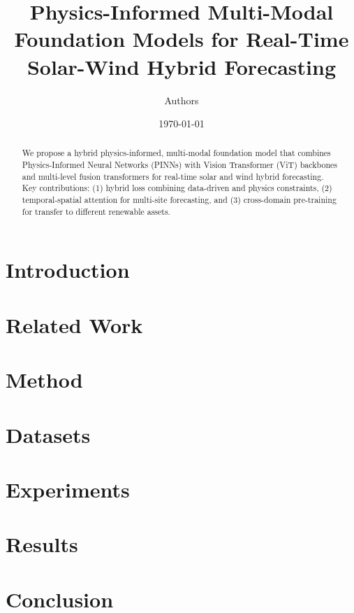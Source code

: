 \documentclass[11pt]{article}
\title{Physics-Informed Multi-Modal Foundation Models for Real-Time Solar-Wind Hybrid Forecasting}
\author{Authors}
\date{\today}
\begin{document}
\maketitle
\begin{abstract}
We propose a hybrid physics-informed, multi-modal foundation model that combines Physics-Informed Neural Networks (PINNs) with Vision Transformer (ViT) backbones and multi-level fusion transformers for real-time solar and wind hybrid forecasting. Key contributions: (1) hybrid loss combining data-driven and physics constraints, (2) temporal-spatial attention for multi-site forecasting, and (3) cross-domain pre-training for transfer to different renewable assets.
\end{abstract}

\section{Introduction}


\section{Related Work}


\section{Method}


\section{Datasets}


\section{Experiments}


\section{Results}


\section{Conclusion}




\end{document}
